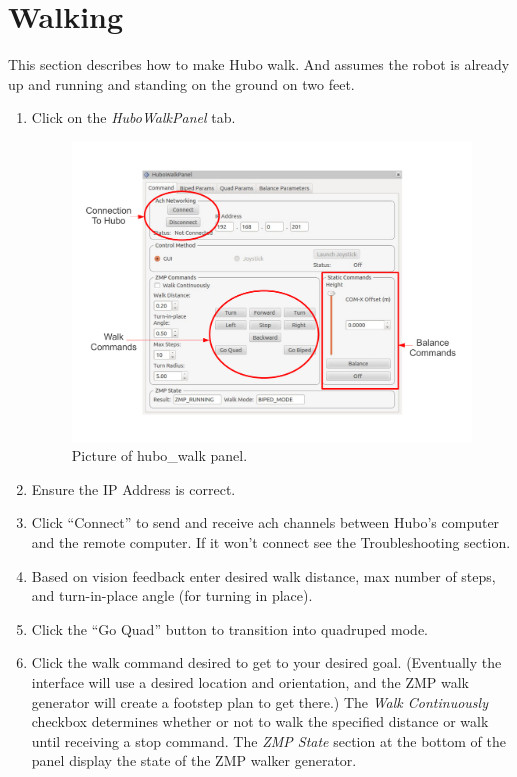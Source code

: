 \documentclass[letterpaper, 10 pt]{report}
\begin{document}
\section{Walking}
This section describes how to make Hubo walk. And assumes the robot is already up and running and standing on the ground on two feet.
  \begin{enumerate}
    \item Click on the \textit{HuboWalkPanel} tab.
    \begin{figure}[ht]
      \centering
      \includegraphics[width=15.0cm]{figures/hubo-walk.pdf}
      \caption{Picture of hubo\_walk panel.}
      \label{fig:hubo-walk-image}
    \end{figure}
    \item Ensure the IP Address is correct.
    \item Click ``Connect'' to send and receive ach channels between Hubo's computer and the remote computer. If it won't connect see the Troubleshooting section.
    \item Based on vision feedback enter desired walk distance, max number of steps, and turn-in-place angle (for turning in place).
    \item Click the ``Go Quad'' button to transition into quadruped mode.
    \item Click the walk command desired to get to your desired goal. (Eventually the interface will use a desired location and orientation, and the ZMP walk generator will create a footstep plan to get there.) The \textit{Walk Continuously} checkbox determines whether or not to walk the specified distance or walk until receiving a stop command. The \textit{ZMP State} section at the bottom of the panel display the state of the ZMP walker generator.

\end{enumerate}
\end{document}
